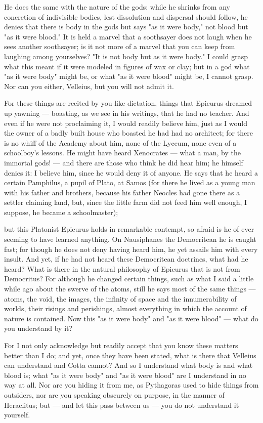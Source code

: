  He does the same with the nature of the gods: while he shrinks from any concretion of indivisible bodies, lest dissolution and dispersal should follow, he denies that there is body in the gods but says "as it were body," not blood but "as it were blood." It is held a marvel that a soothsayer does not laugh when he sees another soothsayer; is it not more of a marvel that you can keep from laughing among yourselves? "It is not body but as it were body." I could grasp what this meant if it were modeled in figures of wax or clay; but in a god what "as it were body" might be, or what "as it were blood" might be, I cannot grasp. Nor can you either, Velleius, but you will not admit it.

 For these things are recited by you like dictation, things that Epicurus dreamed up yawning — boasting, as we see in his writings, that he had no teacher. And even if he were not proclaiming it, I would readily believe him, just as I would the owner of a badly built house who boasted he had had no architect; for there is no whiff of the Academy about him, none of the Lyceum, none even of a schoolboy's lessons. He might have heard Xenocrates — what a man, by the immortal gods! — and there are those who think he did hear him; he himself denies it: I believe him, since he would deny it of anyone. He says that he heard a certain Pamphilus, a pupil of Plato, at Samos (for there he lived as a young man with his father and brothers, because his father Neocles had gone there as a settler claiming land, but, since the little farm did not feed him well enough, I suppose, he became a schoolmaster);

 but this Platonist Epicurus holds in remarkable contempt, so afraid is he of ever seeming to have learned anything. On Nausiphanes the Democritean he is caught fast; for though he does not deny having heard him, he yet assails him with every insult. And yet, if he had not heard these Democritean doctrines, what had he heard? What is there in the natural philosophy of Epicurus that is not from Democritus? For although he changed certain things, such as what I said a little while ago about the swerve of the atoms, still he says most of the same things — atoms, the void, the images, the infinity of space and the innumerability of worlds, their risings and perishings, almost everything in which the account of nature is contained. Now this "as it were body" and "as it were blood" — what do you understand by it?

 For I not only acknowledge but readily accept that you know these matters better than I do; and yet, once they have been stated, what is there that Velleius can understand and Cotta cannot? And so I understand what body is and what blood is; what "as it were body" and "as it were blood" are I understand in no way at all. Nor are you hiding it from me, as Pythagoras used to hide things from outsiders, nor are you speaking obscurely on purpose, in the manner of Heraclitus; but — and let this pass between us — you do not understand it yourself.

